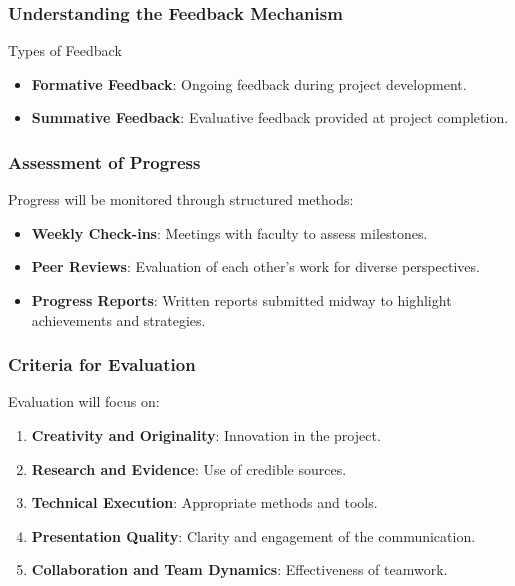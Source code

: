 \documentclass[aspectratio=169]{beamer}
\begin{document}
\begin{frame}[fragile]
    \frametitle{Understanding the Feedback Mechanism}
    \begin{block}{Types of Feedback}
        \begin{itemize}
            \item \textbf{Formative Feedback}: Ongoing feedback during project development.
            \item \textbf{Summative Feedback}: Evaluative feedback provided at project completion.
        \end{itemize}
    \end{block}
\end{frame}

\begin{frame}[fragile]
    \frametitle{Assessment of Progress}
    Progress will be monitored through structured methods:
    \begin{itemize}
        \item \textbf{Weekly Check-ins}: Meetings with faculty to assess milestones.
        \item \textbf{Peer Reviews}: Evaluation of each other's work for diverse perspectives.
        \item \textbf{Progress Reports}: Written reports submitted midway to highlight achievements and strategies.
    \end{itemize}
\end{frame}

\begin{frame}[fragile]
    \frametitle{Criteria for Evaluation}
    Evaluation will focus on:
    \begin{enumerate}
        \item \textbf{Creativity and Originality}: Innovation in the project.
        \item \textbf{Research and Evidence}: Use of credible sources.
        \item \textbf{Technical Execution}: Appropriate methods and tools.
        \item \textbf{Presentation Quality}: Clarity and engagement of the communication.
        \item \textbf{Collaboration and Team Dynamics}: Effectiveness of teamwork.
    \end{enumerate}
\end{frame}
\end{document}
